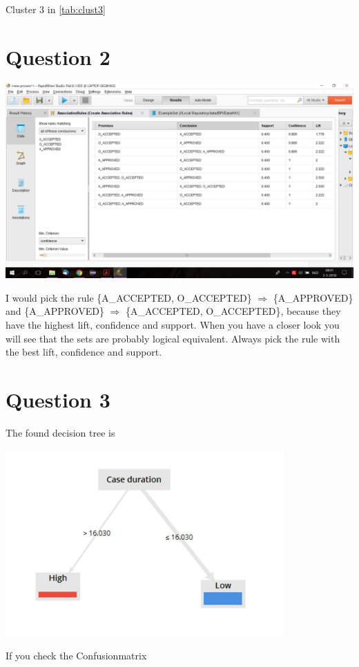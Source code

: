 \documentclass{article}
\begin{document}
Cluster 3 in \ref{tab:clust3}

\clearpage
\section*{Question 2}
\includegraphics[width=1.8\textwidth, angle =90 ]{Question2Rapid.jpg}

I would pick the rule \{A\_ACCEPTED, O\_ACCEPTED\} $\Rightarrow$	\{A\_APPROVED\}
and \{A\_APPROVED\} $\Rightarrow$	\{A\_ACCEPTED, O\_ACCEPTED\}, because they
have the highest lift, confidence and support. When you have a closer look you
will see that the sets are probably logical equivalent. Always pick the rule
with the best lift, confidence and support.

\section*{Question 3}

The found decision tree is 

\includegraphics[width=0.8\textwidth]{Question3Deci.jpg}

If you check the Confusionmatrix
\end{document}
